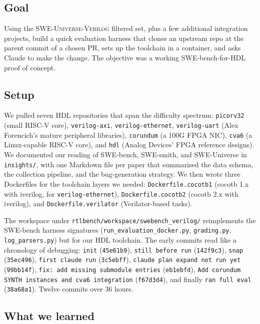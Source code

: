 \documentclass{article}
\begin{document}
\subsection{Goal}

Using the \textsc{SWE-Universe-Verilog} filtered set, plus a few additional integration
projects, build a quick evaluation harness that clones an upstream repo at the parent
commit of a chosen PR, sets up the toolchain in a container, and asks Claude to make the
change. The objective was a working SWE-bench-for-HDL proof of concept.

\subsection{Setup}

We pulled seven HDL repositories that span the difficulty spectrum:
\texttt{picorv32} (small RISC-V core), \texttt{verilog-axi}, \texttt{verilog-ethernet},
\texttt{verilog-uart} (Alex Forencich's mature peripheral libraries),
\texttt{corundum} (a 100G FPGA NIC), \texttt{cva6} (a Linux-capable RISC-V core), and
\texttt{hdl} (Analog Devices' FPGA reference designs). We documented our reading of
SWE-bench, SWE-smith, and SWE-Universe in \texttt{insights/}, with one Markdown file per
paper that summarised the data schema, the collection pipeline, and the bug-generation
strategy. We then wrote three Dockerfiles for the toolchain layers we needed:
\texttt{Dockerfile.cocotb1} (cocotb 1.x with iverilog, for \texttt{verilog-ethernet}),
\texttt{Dockerfile.cocotb2} (cocotb 2.x with iverilog), and \texttt{Dockerfile.verilator}
(Verilator-based tasks).

The workspace under \texttt{rtlbench/workspace/swebench\_verilog/} reimplements the
SWE-bench harness signatures (\texttt{run\_evaluation\_docker.py}, \texttt{grading.py},
\texttt{log\_parsers.py}) but for our HDL toolchain. The early commits read like a
chronology of debugging:
\texttt{init} (\texttt{45e61b9}),
\texttt{still before run} (\texttt{142f9c3}),
\texttt{snap} (\texttt{35ec496}),
\texttt{first claude run} (\texttt{3c5ebff}),
\texttt{claude plan expand not run yet} (\texttt{99bb14f}),
\texttt{fix: add missing submodule entries} (\texttt{eb1ebfd}),
\texttt{Add corundum SYNTH instances and cva6 integration} (\texttt{f67d3d4}),
and finally \texttt{ran full eval} (\texttt{38a68a1}). Twelve commits over 36 hours.

\subsection{What we learned}
\end{document}
